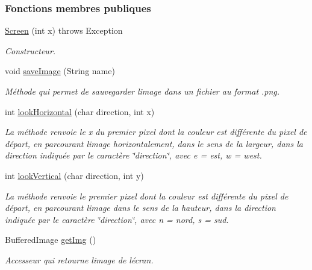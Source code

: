 \subsubsection*{Fonctions membres publiques}
\begin{DoxyCompactItemize}
\item 
\hyperlink{classSuchi_1_1Screen_a2019e9c9e905dea115170dd9b83f771e}{Screen} (int x)  throws Exception 
\begin{DoxyCompactList}\small\item\em Constructeur. \end{DoxyCompactList}\item 
void \hyperlink{classSuchi_1_1Screen_ac888a9c26458a7876fd78193276e95c5}{save\+Image} (String name)
\begin{DoxyCompactList}\small\item\em Méthode qui permet de sauvegarder l\textquotesingle{}image dans un fichier au format .png. \end{DoxyCompactList}\item 
int \hyperlink{classSuchi_1_1Screen_acfa20093b5fa6e0f94869b9d9463d47c}{look\+Horizontal} (char direction, int x)
\begin{DoxyCompactList}\small\item\em La méthode renvoie le x du premier pixel dont la couleur est différente du pixel de départ, en parcourant l\textquotesingle{}image horizontalement, dans le sens de la largeur, dans la direction indiquée par le caractère \char`\"{}direction\char`\"{}, avec e = est, w = west. \end{DoxyCompactList}\item 
int \hyperlink{classSuchi_1_1Screen_ac3e6588086a71450e6fbbe3a597c0446}{look\+Vertical} (char direction, int y)
\begin{DoxyCompactList}\small\item\em La méthode renvoie le premier pixel dont la couleur est différente du pixel de départ, en parcourant l\textquotesingle{}image dans le sens de la hauteur, dans la direction indiquée par le caractère \char`\"{}direction\char`\"{}, avec n = nord, s = sud. \end{DoxyCompactList}\item 
Buffered\+Image \hyperlink{classSuchi_1_1Screen_ac79902ddea3278d98beb21cff6eb893c}{get\+Img} ()
\begin{DoxyCompactList}\small\item\em Accesseur qui retourne l\textquotesingle{}image de l\textquotesingle{}écran. \end{DoxyCompactList}\item 

\end{DoxyCompactItemize}
